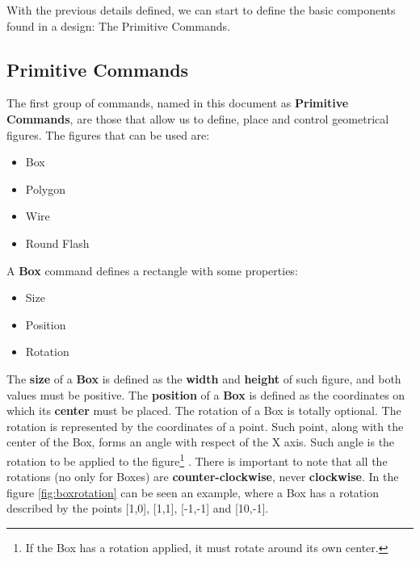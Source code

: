 \documentclass[11pt,twoside,openany,x11names,svgnames]{memoir}
\begin{document}
With the previous details defined, we can start to define the basic components found in a design: The Primitive Commands.

\subsection{Primitive Commands}\label{Primitive-Commands}

The first group of commands, named in this document as \textbf{Primitive Commands}, are those that allow us to define, place and control geometrical figures. The figures that can be used are:

\begin{itemize}
\item Box
\item Polygon
\item Wire
\item Round Flash
\end{itemize}

A \textbf{Box} command defines a rectangle with some properties:

\begin{itemize}
\item Size
\item Position
\item Rotation
\end{itemize}

The \textbf{size} of a \textbf{Box} is defined as the \textbf{width} and \textbf{height} of such figure, and both values must be positive. The \textbf{position} of a \textbf{Box} is defined as the coordinates on which its \textbf{center} must be placed. The rotation of a Box is totally optional. The rotation is represented by the coordinates of a point. Such point, along with the center of the Box, forms an angle with respect of the X axis. Such angle is the rotation to be applied to the figure\footnote{If the Box has a rotation applied, it must rotate around its own center.} . There is important to note that all the rotations (no only for Boxes) are \textbf{counter-clockwise}, never \textbf{clockwise}. In the figure \ref{fig:boxrotation} can be seen an example, where a Box has a rotation described by the points [1,0], [1,1], [-1,-1] and [10,-1].
\end{document}
